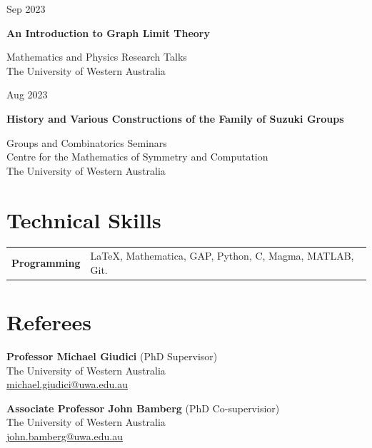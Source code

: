 \documentclass[11pt,a4paper]{article}
\makeatletter
\newcommand{\placeholder}[1]{{\color{muted}[#1]}}
\newcommand{\cventry}[4]{%
  \par\addvspace{7pt}\noindent
  \begin{minipage}[t]{26mm}\raggedright\small\sffamily\color{muted}#1\end{minipage}%
  \begin{minipage}[t]{\dimexpr\textwidth-26mm\relax}
    \setlength{\parskip}{2pt}\raggedright
    \textbf{#2}\par #3\par
    \ifstrempty{#4}{}{\small #4\par}
  \end{minipage}\par}
\newcommand{\cvline}[2]{%
  \begin{tabularx}{\textwidth}{@{}>{\raggedright\arraybackslash}p{30mm}%
    >{\raggedright\arraybackslash}X@{}}\textbf{#1}& #2\end{tabularx}\par}
\makeatother
\begin{document}
\cventry{\large Sep 2023}{An Introduction to Graph Limit Theory}{%
   Mathematics and Physics Research Talks \\  
   The University of Western Australia %
   }{
   }%
  
  
\cventry{\large Aug 2023}{History and Various Constructions of the Family of Suzuki Groups}{%
   Groups and Combinatorics Seminars \\
   Centre for the Mathematics of Symmetry and Computation \\
   The University of Western Australia %
    }{
    }%
    
    


\section{Technical Skills}
\cvline{Programming}{\LaTeX, Mathematica, GAP, Python, C, Magma, MATLAB, Git.}

\section{Referees}
\begin{flushleft}
\textbf{Professor Michael Giudici} (PhD Supervisor) \\
The University of Western Australia \\
\href{mailto:michael.giudici@uwa.edu.au}{michael.giudici@uwa.edu.au}
\end{flushleft}

\begin{flushleft}
\textbf{Associate Professor John Bamberg} (PhD Co-supervisior) \\
The University of Western Australia \\
\href{mailto:john.bamberg@uwa.edu.au}{john.bamberg@uwa.edu.au}
\end{flushleft}
\end{document}
